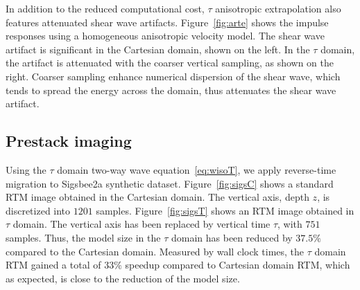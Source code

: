 
In addition to the reduced computational cost, $\tau$ anisotropic extrapolation also features attenuated shear wave artifacts. Figure~\ref{fig:arte} shows the impulse responses using a homogeneous anisotropic velocity model. The shear wave artifact is significant in the Cartesian domain, shown on the left.
In the $\tau$ domain, the artifact is attenuated with the coarser vertical sampling, as shown on the right. Coarser sampling enhance numerical dispersion of the shear wave, which tends to spread the energy across the domain, thus attenuates the shear wave artifact.



\subsection{Prestack imaging}


Using the $\tau$ domain two-way wave equation~\ref{eq:wisoT}, we apply reverse-time migration to Sigsbee2a synthetic dataset.
Figure~\ref{fig:sigsC} shows a standard RTM image obtained in the Cartesian domain. The vertical axis, depth $z$, is discretized into $1201$ samples.
Figure~\ref{fig:sigsT} shows an RTM image obtained in $\tau$ domain. The vertical axis has been replaced by vertical time $\tau$, with $751$ samples.
Thus, the model size in the $\tau$ domain has been reduced by $37.5\%$ compared to the Cartesian domain.
Measured by wall clock times, the $\tau$ domain RTM gained a total of $33\%$ speedup compared to Cartesian domain RTM, which  as expected, is close to the reduction of the model size. 

